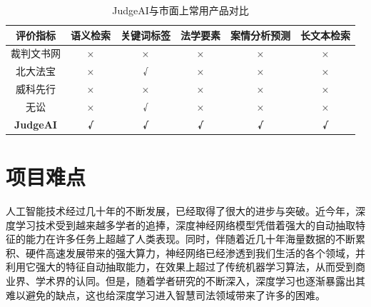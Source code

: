 
\begin{table}[ht]
\begin{tabular}{c|ccccc}
\hline
评价指标             & 语义检索       & 关键词标签      & 法学要素       & 案情分析预测     & 长文本检索      \\ \hline
裁判文书网            & ×          & ×          & ×          & ×          & ×          \\
北大法宝             & ×          & √          & ×          & ×          & ×          \\
威科先行             & ×          & ×          & ×          & ×          & ×          \\
无讼               & ×          & √          & ×          & ×          & ×          \\ \hline
\textbf{JudgeAI} & \textbf{√} & \textbf{√} & \textbf{√} & \textbf{√} & \textbf{√} \\
\hline
\end{tabular}
\caption{JudgeAI与市面上常用产品对比}
\label{background:compare}
\end{table}

\section{项目难点}
人工智能技术经过几十年的不断发展，已经取得了很大的进步与突破。近今年，深度学习技术受到越来越多学者的追捧，深度神经网络模型凭借着强大的自动抽取特征的能力在许多任务上超越了人类表现。同时，伴随着近几十年海量数据的不断累积、硬件高速发展带来的强大算力，神经网络已经渗透到我们生活的各个领域，并利用它强大的特征自动抽取能力，在效果上超过了传统机器学习算法，从而受到商业界、学术界的认同。但是，随着学者研究的不断深入，深度学习也逐渐暴露出其难以避免的缺点，这也给深度学习进入智慧司法领域带来了许多的困难。

